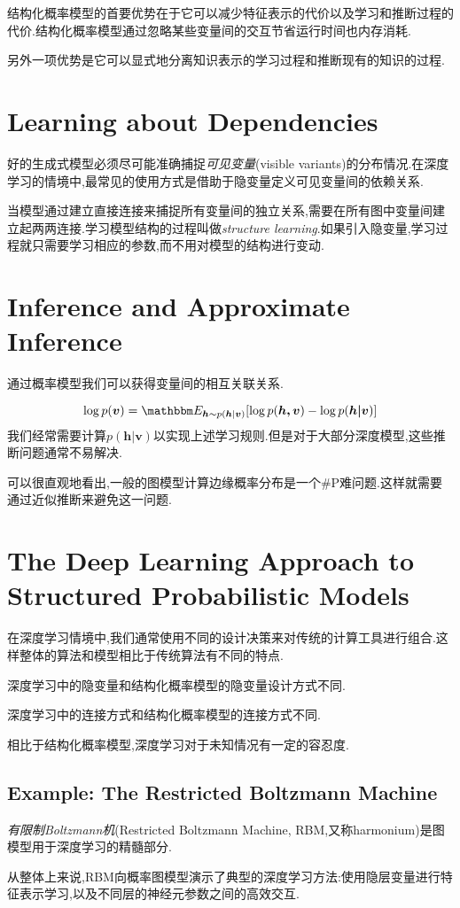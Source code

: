 结构化概率模型的首要优势在于它可以减少特征表示的代价以及学习和推断过程的代价.结构化概率模型通过忽略某些变量间的交互节省运行时间也内存消耗.

另外一项优势是它可以显式地分离知识表示的学习过程和推断现有的知识的过程.

\section{Learning about Dependencies}

好的生成式模型必须尽可能准确捕捉\textit{可见变量}(visible variants)的分布情况.在深度学习的情境中,最常见的使用方式是借助于隐变量定义可见变量间的依赖关系.

当模型通过建立直接连接来捕捉所有变量间的独立关系,需要在所有图中变量间建立起两两连接.学习模型结构的过程叫做\textit{structure learning}.如果引入隐变量,学习过程就只需要学习相应的参数,而不用对模型的结构进行变动.

\section{Inference and Approximate Inference}

通过概率模型我们可以获得变量间的相互关联关系.

\begin{equation}
\log p(\bm v)=\mathbbm E_{\bm h\sim p(\bm h|\bm v)}[\log p(\bm{h,v})-\log p(\bm{h|v})]
\end{equation}
我们经常需要计算$p(\bm{h|v})$以实现上述学习规则.但是对于大部分深度模型,这些推断问题通常不易解决.

可以很直观地看出,一般的图模型计算边缘概率分布是一个\#P难问题.这样就需要通过近似推断来避免这一问题.

\section{The Deep Learning Approach to Structured Probabilistic Models}

在深度学习情境中,我们通常使用不同的设计决策来对传统的计算工具进行组合.这样整体的算法和模型相比于传统算法有不同的特点.

深度学习中的隐变量和结构化概率模型的隐变量设计方式不同.

深度学习中的连接方式和结构化概率模型的连接方式不同.

相比于结构化概率模型,深度学习对于未知情况有一定的容忍度.

\subsection{Example: The Restricted Boltzmann Machine}

\textit{有限制Boltzmann机}(Restricted Boltzmann Machine, RBM,又称harmonium)是图模型用于深度学习的精髓部分.

从整体上来说,RBM向概率图模型演示了典型的深度学习方法:使用隐层变量进行特征表示学习,以及不同层的神经元参数之间的高效交互.